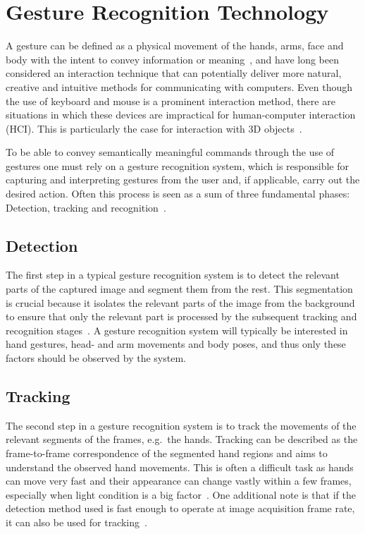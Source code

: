 \chapter{Gesture Recognition Technology}
A gesture can be defined as a physical movement of the hands, arms, face and body with the intent to convey information or meaning~\citep{Mitra2007}, and have long been considered an interaction technique that can potentially deliver more natural, creative and intuitive methods for communicating with computers. Even though
the use of keyboard and mouse is a prominent interaction method, there are situations in which
these devices are impractical for human-computer interaction (HCI). This is particularly the case for interaction with 3D objects~\citep{Rautaray2015}. 

To be able to convey semantically meaningful commands through the use of gestures one must rely on a gesture recognition system, which is responsible for capturing and interpreting gestures from the user and, if applicable, carry out the desired action. Often this process is seen as a sum of three fundamental phases: Detection, tracking and recognition~\citep{Rautaray2015}.

\section{Detection}
The first step in a typical gesture recognition system is to detect the relevant parts of the captured image and segment them from the rest. This segmentation is crucial because it isolates the relevant parts of the image from the background to ensure that only the relevant part is processed by the subsequent tracking and recognition stages~\citep{Cote2006}. A gesture recognition system will typically be interested in hand gestures, head- and arm movements and body poses, and thus only these factors should be observed by the system.

\section{Tracking}
The second step in a gesture recognition system is to track the movements of the relevant segments of the frames, e.g.~the hands. Tracking can be described as the frame-to-frame correspondence of the segmented hand regions and aims to understand the observed hand movements. This
is often a difficult task as hands can move very fast and their appearance can change vastly within a few frames, especially when light condition is a big factor~\citep{Wang2010}. One additional note is that if the detection method used is fast enough to operate at image acquisition frame rate, it can also be used for tracking~\citep{Rautaray2015}.   

